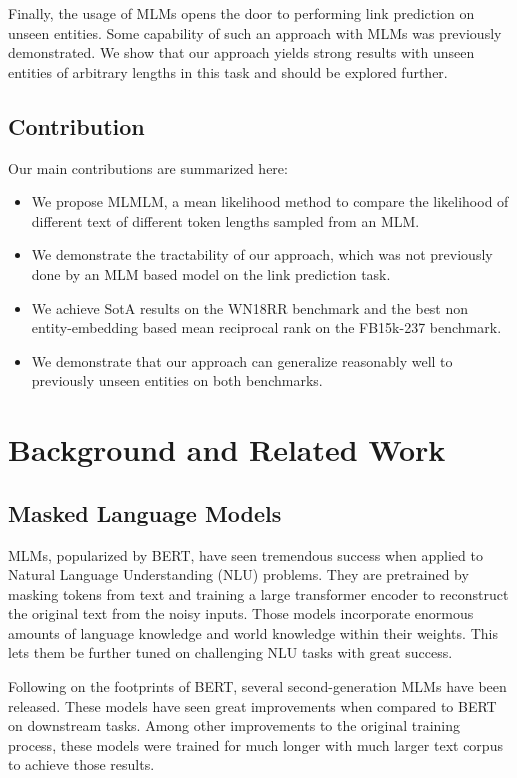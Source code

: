 \documentclass[11pt,a4paper]{article}
\begin{document}
Finally, the usage of MLMs opens the door to performing link prediction on unseen entities.
Some capability of such an approach with MLMs was previously demonstrated.
We show that our approach yields strong results with unseen entities of arbitrary lengths in this task and should be explored further.

\subsection{Contribution}
Our main contributions are summarized here:

\begin{itemize}[noitemsep]
    \item We propose MLMLM, a mean likelihood method to compare the likelihood of different text of different token lengths sampled from an MLM.
    \item We demonstrate the tractability of our approach, which was not previously done by an MLM based model on the link prediction task.
    \item We achieve SotA results on the WN18RR benchmark and the best non entity-embedding based mean reciprocal rank on the FB15k-237 benchmark.
    \item We demonstrate that our approach can generalize reasonably well to previously unseen entities on both benchmarks.
\end{itemize}

\section{Background and Related Work}\label{sec:bg_rw}

\subsection{Masked Language Models}


MLMs, popularized by BERT, have seen tremendous success when applied to Natural Language Understanding (NLU) problems.
They are pretrained by masking tokens from text and training a large transformer encoder to reconstruct the original text from the noisy inputs.
Those models incorporate enormous amounts of language knowledge and world knowledge within their weights.
This lets them be further tuned on challenging NLU tasks with great success.

Following on the footprints of BERT, several second-generation MLMs have been released.
These models have seen great improvements when compared to BERT on downstream tasks.
Among other improvements to the original training process, these models were trained for much longer with much larger text corpus to achieve those results.
\end{document}
